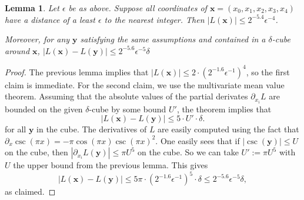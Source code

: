 \documentclass{article}
\newtheorem{lem}[thm]{Lemma}
\newcommand{\abs}[1]{\left|#1\right|}
\renewcommand{\vec}[1]{\mathbf{#1}}
\begin{document}
\begin{lem}\label{L-bounds}
  Let \(\epsilon\) be as above.  Suppose all coordinates of \(\vec x = (x_0,x_1,x_2,x_3,x_4)\) have a distance of a least \(\epsilon\) to the nearest integer. Then
  \(
  \abs{L(\vec x)} \leq 2^{-5.4}\epsilon^{-4}
  \).
  
  Moreover, for any \(\vec y\) satisfying the same assumptions and contained in a \(\delta\)-cube around \(\vec x\),
  \(
  \abs{L(\vec x) - L(\vec y)} \leq  2^{-5.6}\epsilon^{-5}\delta
  \)
\end{lem}

\begin{proof}
  The previous lemma implies that \(\abs{L(\vec x)} \leq 2\cdot (2^{-1.6}\epsilon^{-1})^4\), so the first claim is immediate. For the second claim, we use the multivariate mean value theorem.  Assuming that the absolute values of the partial derivates \(\partial_{x_i} L\) are bounded on the given \(\delta\)-cube by some bound \(U'\), the theorem implies that 
  \[
    \abs{L(\vec x)-L(\vec y)} \leq 5·U'·\delta.
  \]
  for all \(\vec y\) in the cube.  The derivatives of \(L\) are easily computed using the fact that \(\partial_x \csc(\pi x)  = -\pi \cos(\pi x) \csc(\pi x)^2\).  One easily sees that if \(\abs{\csc(\vec y)}\leq U\) on the cube, then \(\abs{\partial_{x_i} L(\vec y)} \leq \pi U^5\) on the cube.  So we can take \(U' := \pi U^5\) with \(U\) the upper bound from the previous lemma.  This gives
  \[
    \abs{L(\vec x)-L(\vec y)} 
    \leq 5\pi·(2^{-1.6}\epsilon^{-1})^5·\delta 
    \leq 2^{-5.6}\epsilon^{-5}\delta,
  \]
  as claimed.
\end{proof}
\end{document}
